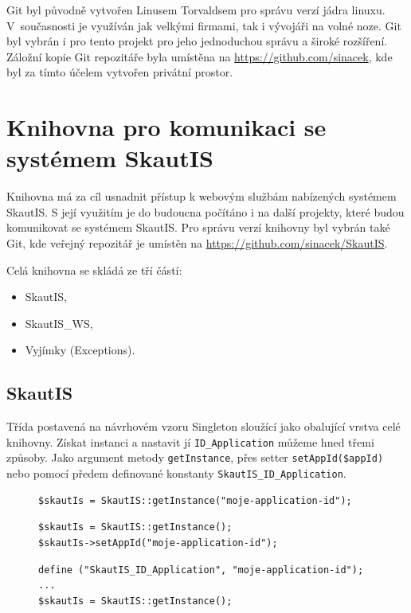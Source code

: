 \documentclass[thesis=B,czech]{FITthesis}[2011/06/14]
\begin{document}
Git byl původně vytvořen Linusem Torvaldsem pro správu verzí jádra linuxu. V~současnosti je využíván jak velkými firmami, tak i vývojáři na volné noze. Git byl vybrán i pro tento projekt pro jeho jednoduchou správu a široké rozšíření. Záložní kopie Git repozitáře byla umístěna na \url{https://github.com/sinacek}, kde byl za tímto účelem vytvořen privátní prostor.

\section{Knihovna pro komunikaci se systémem SkautIS}
Knihovna má za cíl usnadnit přístup k webovým službám nabízených systémem SkautIS. S její využitím je do budoucna počítáno i na další projekty, které budou komunikovat se systémem SkautIS. Pro správu verzí knihovny byl vybrán také Git, kde veřejný repozitář je umístěn na \url{https://github.com/sinacek/SkautIS}.

Celá knihovna se skládá ze tří částí:
\begin{itemize}
	\item SkautIS,
	\item SkautIS\_WS,
	\item Vyjímky (Exceptions).
\end{itemize}

\subsection{SkautIS}
Třída postavená na návrhovém vzoru Singleton sloužící jako obalující vrstva celé knihovny. Získat instanci a nastavit jí \texttt{ID\_Application} můžeme hned třemi způsoby. Jako argument metody \texttt{getInstance}, přes setter \texttt{setAppId(\$appId)} nebo pomocí předem definované konstanty \texttt{SkautIS\_ID\_Application}.

\begin{figure}
\begin{lstlisting}[caption=Nastavení parametrů knihovny SkautIS -- přes argument]
$skautIs = SkautIS::getInstance("moje-application-id");
\end{lstlisting}

\begin{lstlisting}[caption=Nastavení parametrů knihovny SkautIS -- přes setter]
$skautIs = SkautIS::getInstance();
$skautIs->setAppId("moje-application-id"); 
\end{lstlisting}

\begin{lstlisting}[caption=Nastavení parametrů knihovny SkautIS -- přes konstantu]
define ("SkautIS_ID_Application", "moje-application-id"); 
...
$skautIs = SkautIS::getInstance(); 
\end{lstlisting}
\end{figure}
\end{document}

